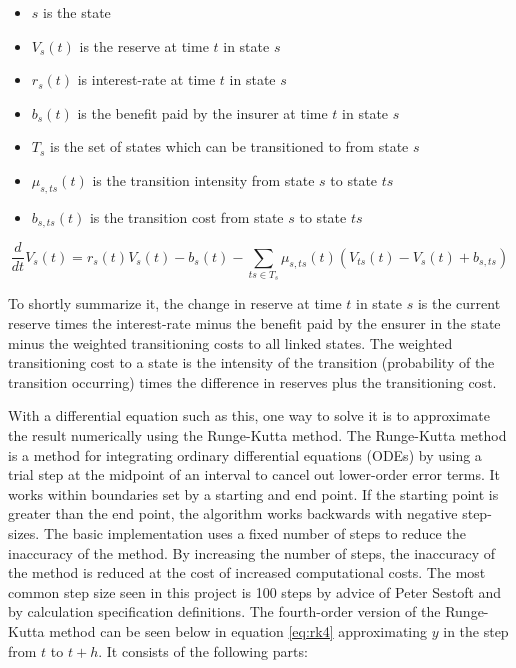 \begin{itemize}
\item $s$ is the state
\item $V_s(t)$ is the reserve at time $t$ in state $s$
\item $r_s(t)$ is interest-rate at time $t$ in state $s$
\item $b_s(t)$ is the benefit paid by the insurer at time $t$ in state $s$
\item $T_s$ is the set of states which can be transitioned to from state $s$
\item $\mu_{s,ts}(t)$ is the transition intensity from state $s$ to state $ts$
\item $b_{s,ts}(t)$ is the transition cost from state $s$ to state $ts$
\end{itemize}

\begin{equation}\label{eq:thiele}
\frac{d}{dt}V_s(t) = r_s(t) V_s(t) - b_s(t) - \sum_{ts \in T_{s}} \mu_{s,ts}(t) (V_{ts}(t) - V_s(t) + b_{s,ts})
\end{equation}

To shortly summarize it, the change in reserve at time $t$ in state $s$ is the current reserve times the interest-rate minus the benefit paid by the ensurer in the state minus the weighted transitioning costs to all linked states. 
The weighted transitioning cost to a state is the intensity of the transition (probability of the transition occurring) times the difference in reserves plus the transitioning cost.

With a differential equation such as this, one way to solve it is to approximate the result numerically using the Runge-Kutta method.
The Runge-Kutta method\cite{press2007numerical} is a method for integrating ordinary differential equations (ODEs) by using a trial step at the midpoint of an interval to cancel out lower-order error terms.
It works within boundaries set by a starting and end point. 
If the starting point is greater than the end point, the algorithm works backwards with negative step-sizes.
The basic implementation uses a fixed number of steps to reduce the inaccuracy of the method. 
By increasing the number of steps, the inaccuracy of the method is reduced at the cost of increased computational costs.
The most common step size seen in this project is 100 steps by advice of Peter Sestoft and by calculation specification definitions.
The fourth-order version of the Runge-Kutta method can be seen below in equation \ref{eq:rk4} approximating $y$ in the step from $t$ to $t+h$. It consists of the following parts:

